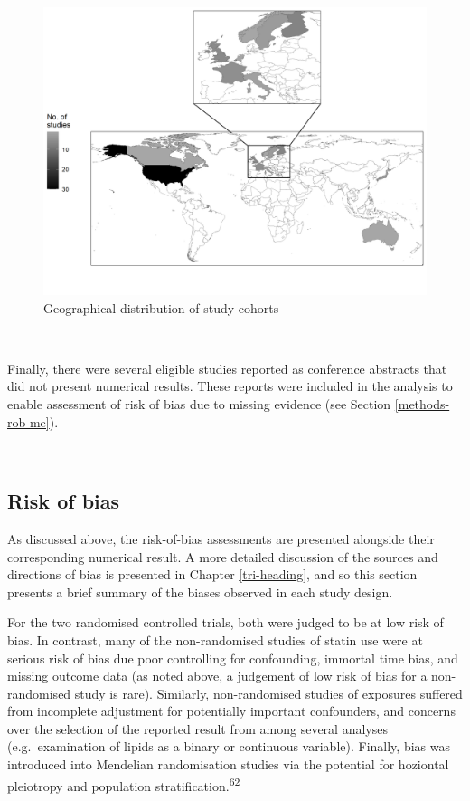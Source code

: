 \documentclass[a4paper, twoside]{templates/ociamthesis}
\begin{document}
\begin{figure}[H]
\includegraphics[width=1\linewidth]{figures/sys-rev/cohortLocations} \caption[Geographical distribution of study cohorts]{Geographical distribution of study cohorts}\label{fig:cohortLocations}
\end{figure}

~

Finally, there were several eligible studies reported as conference abstracts that did not present numerical results. These reports were included in the analysis to enable assessment of risk of bias due to missing evidence (see Section \ref{methods-rob-me}).

~

\hypertarget{risk-of-bias-res}{%
\subsection{Risk of bias}\label{risk-of-bias-res}}

As discussed above, the risk-of-bias assessments are presented alongside their corresponding numerical result. A more detailed discussion of the sources and directions of bias is presented in Chapter \ref{tri-heading}, and so this section presents a brief summary of the biases observed in each study design.

For the two randomised controlled trials, both were judged to be at low risk of bias. In contrast, many of the non-randomised studies of statin use were at serious risk of bias due poor controlling for confounding, immortal time bias, and missing outcome data (as noted above, a judgement of low risk of bias for a non-randomised study is rare). Similarly, non-randomised studies of exposures suffered from incomplete adjustment for potentially important confounders, and concerns over the selection of the reported result from among several analyses (e.g.~examination of lipids as a binary or continuous variable). Finally, bias was introduced into Mendelian randomisation studies via the potential for hoziontal pleiotropy and population stratification.\textsuperscript{\protect\hyperlink{ref-davies2018}{62}}
\end{document}
